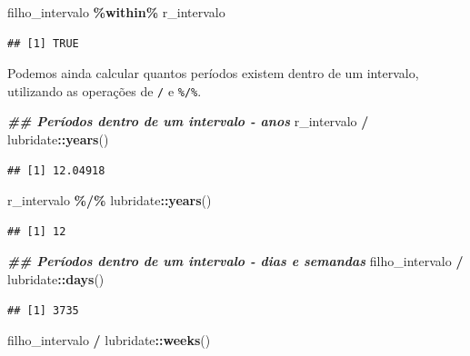 \documentclass[
]{article}
\newenvironment{Shaded}{\begin{snugshade}}{\end{snugshade}}
\newcommand{\DocumentationTok}[1]{\textcolor[rgb]{0.56,0.35,0.01}{\textbf{\textit{#1}}}}
\newcommand{\FunctionTok}[1]{\textcolor[rgb]{0.13,0.29,0.53}{\textbf{#1}}}
\newcommand{\NormalTok}[1]{#1}
\newcommand{\SpecialCharTok}[1]{\textcolor[rgb]{0.81,0.36,0.00}{\textbf{#1}}}
\begin{document}
\begin{Shaded}
\begin{Highlighting}[]
\NormalTok{filho\_intervalo }\SpecialCharTok{\%within\%}\NormalTok{ r\_intervalo}
\end{Highlighting}
\end{Shaded}

\begin{verbatim}
## [1] TRUE
\end{verbatim}

Podemos ainda calcular quantos períodos existem dentro de um intervalo, utilizando as operações de \texttt{/} e \texttt{\%/\%}.

\begin{Shaded}
\begin{Highlighting}[]
\DocumentationTok{\#\# Períodos dentro de um intervalo {-} anos}
\NormalTok{r\_intervalo }\SpecialCharTok{/}\NormalTok{ lubridate}\SpecialCharTok{::}\FunctionTok{years}\NormalTok{()}
\end{Highlighting}
\end{Shaded}

\begin{verbatim}
## [1] 12.04918
\end{verbatim}

\begin{Shaded}
\begin{Highlighting}[]
\NormalTok{r\_intervalo }\SpecialCharTok{\%/\%}\NormalTok{ lubridate}\SpecialCharTok{::}\FunctionTok{years}\NormalTok{()}
\end{Highlighting}
\end{Shaded}

\begin{verbatim}
## [1] 12
\end{verbatim}

\begin{Shaded}
\begin{Highlighting}[]
\DocumentationTok{\#\# Períodos dentro de um intervalo {-} dias e semandas}
\NormalTok{filho\_intervalo }\SpecialCharTok{/}\NormalTok{ lubridate}\SpecialCharTok{::}\FunctionTok{days}\NormalTok{()}
\end{Highlighting}
\end{Shaded}

\begin{verbatim}
## [1] 3735
\end{verbatim}

\begin{Shaded}
\begin{Highlighting}[]
\NormalTok{filho\_intervalo }\SpecialCharTok{/}\NormalTok{ lubridate}\SpecialCharTok{::}\FunctionTok{weeks}\NormalTok{()}
\end{Highlighting}
\end{Shaded}
\end{document}

